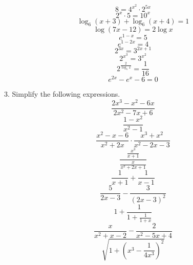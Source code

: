 \documentclass[11pt]{article}
\begin{document}
  \begin{equation}
    \label{eq:phahmobu}
    8=4^{x^{2}}\cdot{}2^{5x}
  \end{equation}
  \begin{equation}
    \label{eq:xonguoge}
    2^{x}\cdot{}5=10^{x}
  \end{equation}
  \begin{equation}
    \label{eq:aeshaite}
    \log_{6}(x+3)+\log_{6}(x+4)=1
  \end{equation}
  \begin{equation}
    \label{eq:eequabae}
    \log(7x-12)=2\log{}x
  \end{equation}
  \begin{equation}
    \label{eq:niephait}
    e^{1-x}=5
  \end{equation}
  \begin{equation}
    \label{eq:eophooki}
    e^{1-2x}=4
  \end{equation}
  \begin{equation}
    \label{eq:eevaicei}
    2^{3x}=3^{2x+1}
  \end{equation}
  \begin{equation}
    \label{eq:ohquaiva}
    2^{x^{3}}=3^{x^{2}}
  \end{equation}
  \begin{equation}
    \label{eq:poikeeng}
    2^{\frac{2}{\log_{5}x}}=\frac{1}{16}
  \end{equation}
\begin{equation}
  \label{eq:haesiiro}
  e^{2x}-e^{x}-6=0
\end{equation}

3. Simplify the following expressions.
\begin{equation}
  \label{eq:uxohjeib}
\frac{2x^{3}-x^{2}-6x}{2x^{2}-7x+6}
\end{equation}
\begin{equation}
  \label{eq:eicohrae}
\frac{1-x^{2}}{x^{2}-1}
\end{equation}
\begin{equation}
  \label{eq:epuufeca}
\frac{x^{2}-x-6}{x^{2}+2x}\cdot\frac{x^{3}+x^{2}}{x^{2}-2x-3}
\end{equation}
\begin{equation}
  \label{eq:weungodu}
\frac{\frac{x^{3}}{x+1}}{\frac{x}{x^{2}+2x+1}}
\end{equation}
\begin{equation}
  \label{eq:oraighah}
\frac{1}{x+1}+\frac{1}{x-1}
\end{equation}
\begin{equation}
  \label{eq:saenonge}
\frac{5}{2x-3}-\frac{3}{(2x-3)^{2}}
\end{equation}
\begin{equation}
  \label{eq:eeghoghi}
1+\frac{1}{1+\frac{1}{1+x}}
\end{equation}
\begin{equation}
  \label{eq:eesicaet}
\frac{x}{x^{2}+x-2}-\frac{2}{x^{2}-5x+4}
\end{equation}
\begin{equation}
  \label{eq:fixahfee}
\sqrt{1+\left(x^{3}-\frac{1}{4x^{3}}\right)^{2}}
\end{equation}
\end{document}
